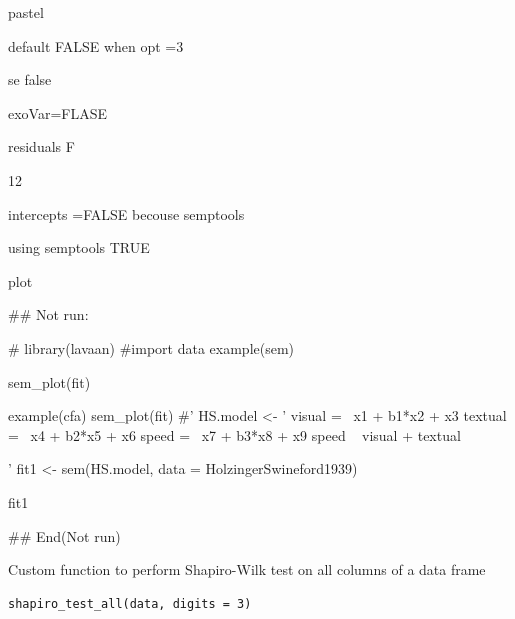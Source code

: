 \documentclass[a4paper]{book}
\begin{document}
\begin{Arguments}
\begin{ldescription}
\item[\code{pastel}] pastel

\item[\code{fade}] default FALSE when opt =3

\item[\code{se}] se false

\item[\code{exoVar}] exoVar=FLASE

\item[\code{residuals}] residuals F

\item[\code{residScale}] 12

\item[\code{intercepts}] intercepts =FALSE becouse semptools

\item[\code{semptools}] using semptools TRUE
\end{ldescription}
\end{Arguments}
%
\begin{Value}
plot
\end{Value}
%
\begin{Examples}
\begin{ExampleCode}

\#\# Not run: 

# library(lavaan)
#import data
example(sem)

sem_plot(fit)

example(cfa)
sem_plot(fit)
#'
HS.model <- '
    visual  =~ x1 + b1*x2 + x3
    textual =~ x4 + b2*x5 + x6
    speed   =~ x7 + b3*x8 + x9
speed ~ visual + textual

'
fit1 <- sem(HS.model, data = HolzingerSwineford1939)

fit1 %

## End(Not run)
\end{ExampleCode}
\end{Examples}
%
\begin{Description}
Custom function to perform Shapiro-Wilk test on all columns of a data frame
\end{Description}
%
\begin{Usage}
\begin{verbatim}
shapiro_test_all(data, digits = 3)
\end{verbatim}
\end{Usage}
\end{document}

